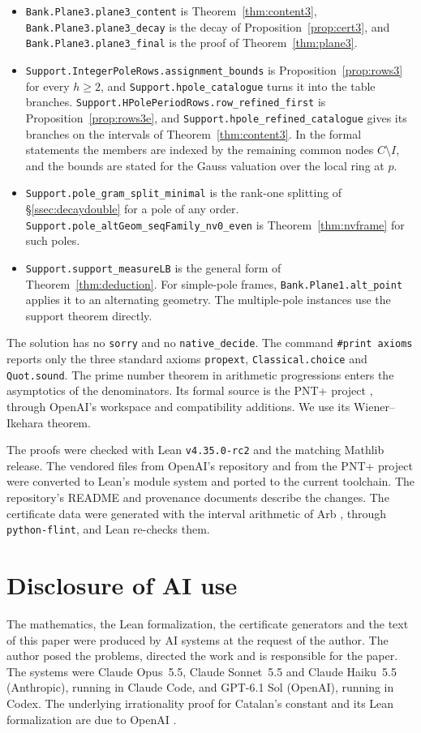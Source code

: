 \documentclass[11pt]{amsart}
\theoremstyle{definition}
\theoremstyle{remark}
\numberwithin{equation}{section}
\newcommand{\lean}[1]{\nolinkurl{#1}}
\begin{document}
\begin{itemize}
 $\gamma_1=0$, and $\gamma_2=0$.
\item \lean{Bank.Plane3.plane3_content} is Theorem~\ref{thm:content3}, \lean{Bank.Plane3.plane3_decay} is the decay of
 Proposition~\ref{prop:cert3}, and \lean{Bank.Plane3.plane3_final} is the proof of Theorem~\ref{thm:plane3}.
\item \lean{Support.IntegerPoleRows.assignment_bounds} is Proposition~\ref{prop:rows3} for every $h\ge2$, and
 \lean{Support.hpole_catalogue} turns it into the table branches. \lean{Support.HPolePeriodRows.row_refined_first} is
 Proposition~\ref{prop:rows3e}, and \lean{Support.hpole_refined_catalogue} gives its branches on the intervals of
 Theorem~\ref{thm:content3}. In the formal statements the members are indexed by the remaining common nodes
 $C\setminus I$, and the bounds are stated for the Gauss valuation over the local ring at $p$.
\item \lean{Support.pole_gram_split_minimal} is the rank-one splitting of \S\ref{ssec:decaydouble} for a pole of any
 order. \lean{Support.pole_altGeom_seqFamily_nv0_even} is Theorem~\ref{thm:nvframe} for such poles.
\item \lean{Support.support_measureLB} is the general form of Theorem~\ref{thm:deduction}. For simple-pole frames,
 \lean{Bank.Plane1.alt_point} applies it to an alternating geometry. The multiple-pole instances use the support theorem directly.
\end{itemize}
The solution has no \lean{sorry} and no \lean{native_decide}. The command \texttt{\#print axioms} reports only the three
standard axioms \lean{propext}, \lean{Classical.choice} and \lean{Quot.sound}. The prime number theorem in arithmetic
progressions enters the asymptotics of the denominators. Its formal source is the PNT+ project \cite{PNTPlus}, through OpenAI's
workspace and compatibility additions. We use its Wiener--Ikehara theorem.

The proofs were checked with Lean \texttt{v4.35.0-rc2} and the matching Mathlib release. The vendored files from OpenAI's
repository and from the PNT+ project were converted to Lean's module system and ported to the current toolchain. The repository's README and provenance documents describe the changes. The certificate data were generated with
the interval arithmetic of Arb \cite{Arb}, through \texttt{python-flint}, and Lean re-checks them.

\section*{Disclosure of AI use}
The mathematics, the Lean formalization, the certificate generators and the text of this paper were produced by AI
systems at the request of the author. The author posed the problems, directed the work and is responsible for the
paper. The systems were Claude Opus~5.5, Claude Sonnet~5.5 and Claude Haiku~5.5 (Anthropic), running in Claude Code,
and GPT-6.1 Sol (OpenAI), running in Codex. The underlying irrationality proof for Catalan's constant and its Lean
formalization are due to OpenAI \cite{OpenAI2026}.
\end{document}
